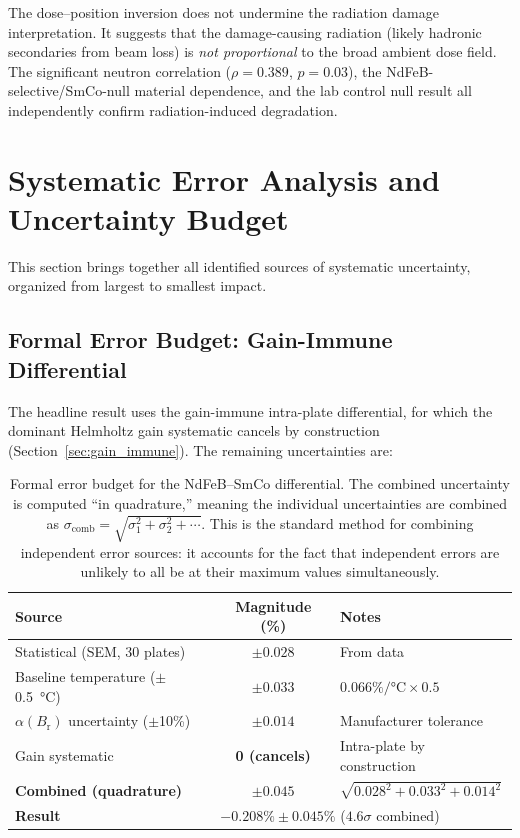 \documentclass[11pt,letterpaper]{article}
\newcommand{\Br}{B_\mathrm{r}}
\newcommand{\alphar}{\alpha(\Br)}
\begin{document}
The dose--position inversion does not undermine the
radiation damage interpretation. It suggests that the damage-causing radiation
(likely hadronic secondaries from beam loss) is \emph{not proportional} to the
broad ambient dose field. The significant neutron correlation ($\rho = 0.389$,
$p = 0.03$), the NdFeB-selective/SmCo-null material dependence, and the lab
control null result all independently confirm radiation-induced degradation.

\section{Systematic Error Analysis and Uncertainty Budget}
\label{sec:systematics}

This section brings together all identified sources of systematic uncertainty,
organized from largest to smallest impact.

\subsection{Formal Error Budget: Gain-Immune Differential}

The headline result uses the gain-immune intra-plate differential, for which
the dominant Helmholtz gain systematic cancels by construction
(Section~\ref{sec:gain_immune}). The remaining uncertainties are:

\begin{table}[H]
\centering
\caption{Formal error budget for the NdFeB--SmCo differential. The combined
uncertainty is computed ``in quadrature,'' meaning the individual uncertainties
are combined as $\sigma_\mathrm{comb} = \sqrt{\sigma_1^2 + \sigma_2^2 + \cdots}$.
This is the standard method for combining independent error sources: it
accounts for the fact that independent errors are unlikely to all be at their
maximum values simultaneously.}
\label{tab:error_budget}
\begin{tabular}{@{}lcl@{}}
\toprule
\textbf{Source} & \textbf{Magnitude (\%)} & \textbf{Notes} \\
\midrule
Statistical (SEM, 30 plates) & $\pm 0.028$ & From data \\
Baseline temperature ($\pm$\SI{0.5}{\celsius}) & $\pm 0.033$ & $0.066\%/\si{\celsius} \times 0.5$ \\
$\alphar$ uncertainty ($\pm$10\%) & $\pm 0.014$ & Manufacturer tolerance \\
Gain systematic & \textbf{0 (cancels)} & Intra-plate by construction\footnotemark \\
\midrule
\textbf{Combined (quadrature)} & $\pm 0.045$ & $\sqrt{0.028^2 + 0.033^2 + 0.014^2}$ \\
\midrule\midrule
\textbf{Result} & \multicolumn{2}{l}{$\mathbf{-0.208\% \pm 0.045\%}$ ($4.6\sigma$ combined)} \\
\bottomrule
\end{tabular}
\end{table}
\end{document}
